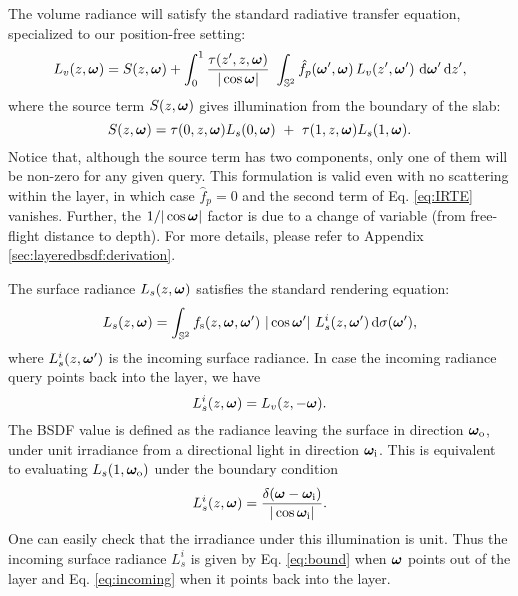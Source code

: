 The volume radiance will satisfy the standard radiative transfer equation, specialized to our position-free setting:
\begin{equation}
\label{eq:IRTE}
L_v(z, \bm\omega) = S(z, \bm\omega) + 
\int_0^1 \frac{\tau(z', z, \bm\omega)}{|\cos\bm\omega|} \, \, \int_{\mathbb{S}^2} \hat f_p(\bm\omega', \bm\omega) \, L_v(z', \bm\omega') \,\,\mathrm{d} \bm\omega' \,\mathrm{d} z',
\end{equation}
where the source term $S(z, \bm\omega)$ gives illumination from the boundary of the slab:
\begin{equation}
S(z, \bm\omega) = \tau(0, z, \bm\omega) L_s(0, \bm\omega) \ + \ \tau(1, z, \bm\omega) L_s(1, \bm\omega).
\end{equation}
Notice that, although the source term has two components, only one of them will be non-zero for any given query.
This formulation is valid even with no scattering within the layer, in which case $\hat f_p = 0$ and the second term of Eq. \eqref{eq:IRTE} vanishes.
Further, the $1/|\cos\bm\omega|$ factor is due to a change of variable (from free-flight distance to depth). For more details, please refer to Appendix \ref{sec:layeredbsdf:derivation}.

The surface radiance $L_s(z, \bm\omega)$ satisfies the standard rendering equation:
\begin{equation}
	\label{eq:RE}
	L_s(z, \bm\omega) = \int_{\mathbb{S}^2} f_\mathrm{s}(z, \bm\omega, \bm\omega') \ |\cos \bm\omega'| \ L_s^i(z, \bm\omega') \,\mathrm{d} \sigma(\bm\omega'),
\end{equation}
where $L_s^i(z, \bm\omega')$ is the incoming surface radiance. In case the incoming radiance query points back into the layer, we have
\begin{equation}
	\label{eq:incoming}
	L_s^i(z, \bm\omega) = L_v(z, -\bm\omega).
\end{equation}
The BSDF value is defined as the radiance leaving the surface in direction $\bm\omega_\mathrm{o}$, under unit irradiance from a directional light in direction $\bm\omega_\mathrm{i}$. This is equivalent to evaluating $L_s(1, \bm\omega_\mathrm{o})$ under the boundary condition
\begin{equation}
	\label{eq:bound}
	L_s^i(z, \bm\omega) = \frac{\delta(\bm\omega - \bm\omega_\mathrm{i})}{|\cos \bm\omega_\mathrm{i}|}.
\end{equation}
One can easily check that the irradiance under this illumination is unit. Thus the incoming surface radiance $L^i_s$ is given by Eq. \eqref{eq:bound} when $\bm\omega$ points out of the layer and Eq. \eqref{eq:incoming} when it points back into the layer.

